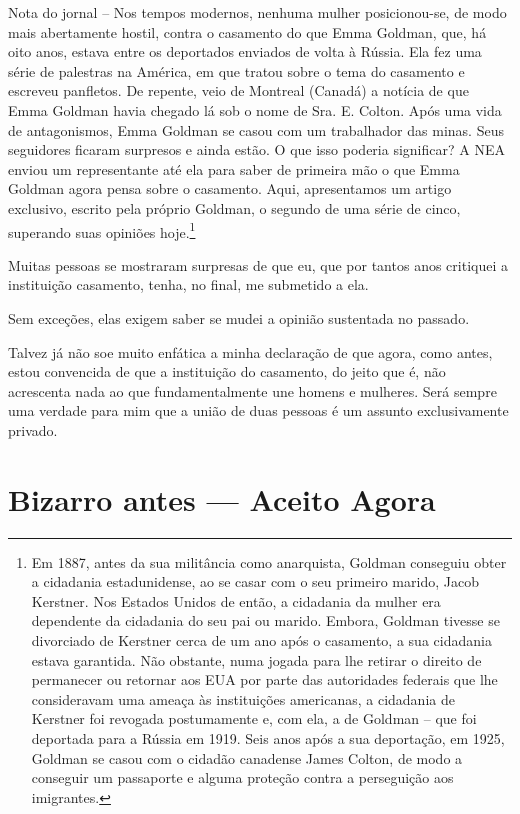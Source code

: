 Nota do jornal -- Nos tempos modernos, nenhuma mulher posicionou-se, de
modo mais abertamente hostil, contra o casamento do que Emma Goldman,
que, há oito anos, estava entre os deportados enviados de volta à
Rússia. Ela fez uma série de palestras na América, em que tratou sobre o
tema do casamento e escreveu panfletos. De repente, veio de Montreal
(Canadá) a notícia de que Emma Goldman havia chegado lá sob o nome de
Sra. E. Colton. Após uma vida de antagonismos, Emma Goldman se casou com
um trabalhador das minas. Seus seguidores ficaram surpresos e ainda
estão. O que isso poderia significar? A NEA enviou um representante até
ela para saber de primeira mão o que Emma Goldman agora pensa sobre o
casamento. Aqui, apresentamos um artigo exclusivo, escrito pela próprio
Goldman, o segundo de uma série de cinco, superando suas opiniões
hoje.\footnote{Em 1887, antes da sua militância como anarquista, Goldman
  conseguiu obter a cidadania estadunidense, ao se casar com o seu
  primeiro marido, Jacob Kerstner. Nos Estados Unidos de então, a
  cidadania da mulher era dependente da cidadania do seu pai ou marido.
  Embora, Goldman tivesse se divorciado de Kerstner cerca de um ano após
  o casamento, a sua cidadania estava garantida. Não obstante, numa
  jogada para lhe retirar o direito de permanecer ou retornar aos EUA
  por parte das autoridades federais que lhe consideravam uma ameaça às
  instituições americanas, a cidadania de Kerstner foi revogada
  postumamente e, com ela, a de Goldman -- que foi deportada para a
  Rússia em 1919. Seis anos após a sua deportação, em 1925, Goldman se
  casou com o cidadão canadense James Colton, de modo a conseguir um
  passaporte e alguma proteção contra a perseguição aos imigrantes.}

\asterisc

Muitas pessoas se mostraram surpresas de que eu, que por tantos anos
critiquei a instituição casamento, tenha, no final, me submetido a ela.

Sem exceções, elas exigem saber se mudei a opinião sustentada no
passado.

Talvez já não soe muito enfática a minha declaração de que agora, como
antes, estou convencida de que a instituição do casamento, do jeito que
é, não acrescenta nada ao que fundamentalmente une homens e mulheres.
Será sempre uma verdade para mim que a união de duas pessoas é um
assunto exclusivamente privado.

\section{Bizarro antes --- Aceito Agora}

